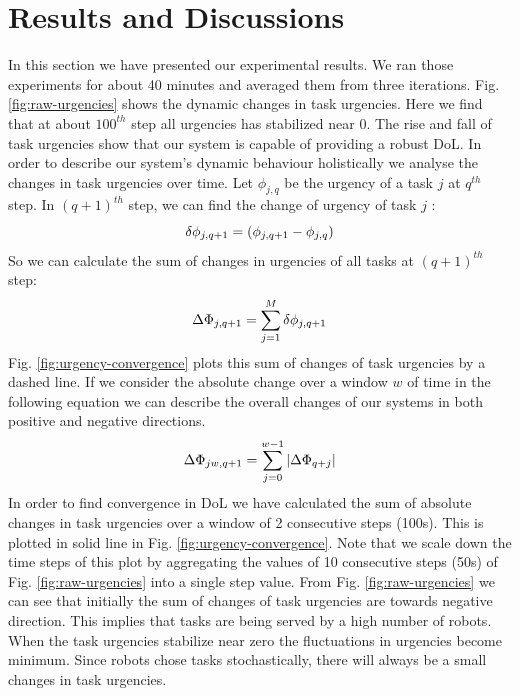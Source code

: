 \documentclass{llncs}
\begin{document}
\section{Results and Discussions}
\label{sec:results}
In this section we have presented our experimental results. We ran those experiments for about 40 minutes and averaged them from three iterations.
Fig. \ref{fig:raw-urgencies} shows the dynamic changes in task urgencies. Here we find that at about $100^{th}$ step all urgencies has stabilized near 0. The rise and fall of task urgencies show that our system is capable of providing a robust DoL. 
In order to describe our system's dynamic behaviour holistically we analyse the changes in task urgencies over time. Let $ \phi_{j, q}$ be the urgency of a task $j$ at $q^{th}$ step. In $(q+1)^{th}$ step, we can find the change of urgency of task $j$ :\\
\begin{equation} 
\small
\delta \phi_{j, q+1} = ( \phi_{j, q+1} - \phi_{j, q}) 
\end{equation}
So we can calculate the sum of changes in urgencies of all tasks at $(q+1)^{th}$ step:
\begin{equation} 
\small
\Delta \Phi_{j, q+1} = \sum_{j=1}^{M} \delta \phi_{j, q+1} 
\label{eqn:Delta-Phi}
\end{equation}
Fig. \ref{fig:urgency-convergence} plots this sum of changes of task urgencies by a dashed line. If we consider the absolute change over a window $w$ of time in the following equation we can describe the overall changes of our systems in both positive and negative directions.
%
\begin{equation}
\small
\Delta \Phi_{jw, q+1} = \sum_{j=0}^{w-1} \left | \Delta \Phi_{q+j} \right |
\end{equation}
%
In order to find convergence in DoL we have calculated the sum of absolute changes in task urgencies over a window of 2 consecutive steps (100s). This is plotted in solid line in Fig. \ref{fig:urgency-convergence}. Note that we scale down the time steps of this plot by aggregating the values of 10 consecutive steps (50s) of Fig. \ref{fig:raw-urgencies} into a single step value.
From Fig. \ref{fig:raw-urgencies} we can see that initially the sum of changes of task urgencies are towards negative direction. This implies that tasks are being served by a high number of robots. When the task urgencies stabilize near zero the fluctuations in urgencies become minimum. Since robots chose tasks stochastically, there will always be a small changes in task urgencies. %
\end{document}
